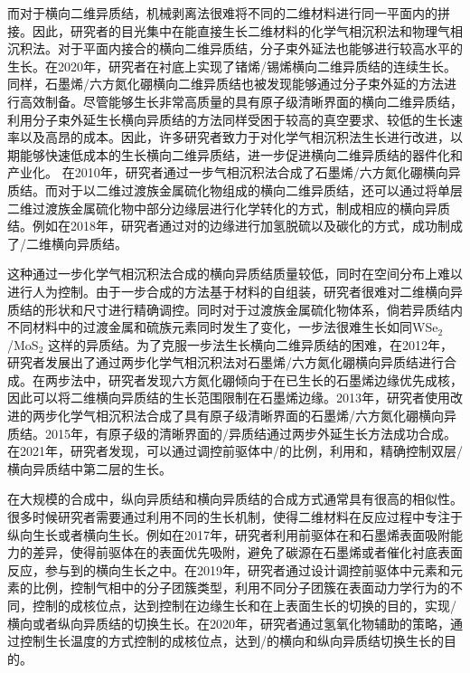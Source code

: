     而对于横向二维异质结，机械剥离法很难将不同的二维材料进行同一平面内的拼接。因此，研究者的目光集中在能直接生长二维材料的化学气相沉积法和物理气相沉积法。对于平面内接合的横向二维异质结，分子束外延法也能够进行较高水平的生长。在2020年，研究者在衬底上实现了锗烯/锡烯横向二维异质结的连续生长。同样，石墨烯/六方氮化硼横向二维异质结也被发现能够通过分子束外延的方法进行高效制备。尽管能够生长非常高质量的具有原子级清晰界面的横向二维异质结，利用分子束外延生长横向异质结的方法同样受困于较高的真空要求、较低的生长速率以及高昂的成本。因此，许多研究者致力于对化学气相沉积法生长进行改进，以期能够快速低成本的生长横向二维异质结，进一步促进横向二维异质结的器件化和产业化。
    在2010年，研究者通过一步气相沉积法合成了石墨烯/六方氮化硼横向异质结。而对于以二维过渡族金属硫化物组成的横向二维异质结，还可以通过将单层二维过渡族金属硫化物中部分边缘层进行化学转化的方式，制成相应的横向异质结。例如在2018年，研究者通过对的边缘进行加氢脱硫以及碳化的方式，成功制成了/二维横向异质结。

    这种通过一步化学气相沉积法合成的横向异质结质量较低，同时在空间分布上难以进行人为控制。由于一步合成的方法基于材料的自组装，研究者很难对二维横向异质结的形状和尺寸进行精确调控。同时对于过渡族金属硫化物体系，倘若异质结内不同材料中的过渡金属和硫族元素同时发生了变化，一步法很难生长如同WSe$_2$/MoS$_2$ 这样的异质结。为了克服一步法生长横向二维异质结的困难，在2012年，研究者发展出了通过两步化学气相沉积法对石墨烯/六方氮化硼横向异质结进行合成。在两步法中，研究者发现六方氮化硼倾向于在已生长的石墨烯边缘优先成核，因此可以将二维横向异质结的生长范围限制在石墨烯边缘。2013年，研究者使用改进的两步化学气相沉积法合成了具有原子级清晰界面的石墨烯/六方氮化硼横向异质结。2015年，有原子级的清晰界面的/异质结通过两步外延生长方法成功合成。在2021年，研究者发现，可以通过调控前驱体中/的比例，利用和，精确控制双层/横向异质结中第二层的生长。

    在大规模的合成中，纵向异质结和横向异质结的合成方式通常具有很高的相似性。很多时候研究者需要通过利用不同的生长机制，使得二维材料在反应过程中专注于纵向生长或者横向生长。例如在2017年，研究者利用前驱体在和石墨烯表面吸附能力的差异，使得前驱体在的表面优先吸附，避免了碳源在石墨烯或者催化衬底表面反应，参与到的横向生长之中。在2019年，研究者通过设计调控前驱体中元素和元素的比例，控制气相中的分子团簇类型，利用不同分子团簇在表面动力学行为的不同，控制的成核位点，达到控制在边缘生长和在上表面生长的切换的目的，实现/横向或者纵向异质结的切换生长。在2020年，研究者通过氢氧化物辅助的策略，通过控制生长温度的方式控制的成核位点，达到/的横向和纵向异质结切换生长的目的。
